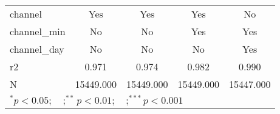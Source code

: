 \begin{tabular}{l*{4}{c}}
channel             &         Yes   &         Yes   &         Yes   &          No   \\
channel\_min         &          No   &          No   &         Yes   &         Yes   \\
channel\_day         &          No   &          No   &          No   &         Yes   \\
r2                  &       0.971   &       0.974   &       0.982   &       0.990   \\
N                   &   15449.000   &   15449.000   &   15449.000   &   15447.000   \\
\bottomrule
\multicolumn{5}{l}{\footnotesize $^{*}p<0.05; \quad ; ^{**} p<0.01; \quad ; ^{***}p<0.001$}\\
\end{tabular}
